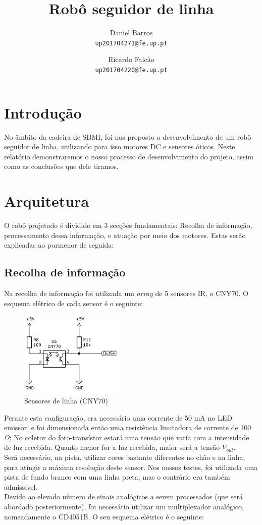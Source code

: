 \documentclass[]{report}
\title{Robô seguidor de linha}
\author{
	Daniel Barros\\
	\texttt{up201704271@fe.up.pt}
	\and
	Ricardo Falcão\\
	\texttt{up201704220@fe.up.pt}
}
\begin{document}
\maketitle

\section*{Introdução}
No âmbito da cadeira de SBMI, foi nos proposto o desenvolvimento de um robô seguidor de linha, utilizando para isso motores DC e sensores óticos. Neste relatório demonstraremos o nosso processo de desenvolvimento do projeto, assim como as conclusões que dele tiramos.

\section*{Arquitetura}
O robô projetado é dividido em 3 secções fundamentais: Recolha de informação, processamento dessa informação, e atuação por meio dos motores. Estas serão explicadas ao pormenor de seguida:

\subsection*{Recolha de informação}
Na recolha de informação foi utilizada um \textit{array} de 5 sensores IR, o CNY70. O esquema elétrico de cada sensor é o seguinte:

\begin{figure}[!htb]
	\centering
	\includegraphics[width=5cm]{imagens/sensor}
	\caption{Sensores de linha (CNY70)}
\end{figure}

Perante esta configuração, era necessário uma corrente de 50 mA no LED emissor, e foi dimensionada então uma resistência limitadora de corrente de 100 $\Omega$; No coletor do foto-transístor estará uma tensão que varía com a intensidade de luz recebida. Quanto menor for a luz recebida, maior será a tensão $V_{out}$. \\
Será necessário, na pista, utilizar cores bastante diferentes no chão e na linha, para atingir a máxima resolução deste sensor. Nos nossos testes, foi utilizada uma pista de fundo branco com uma linha preta, mas o contrário era também admissível. \\
Devido ao elevado número de sinais analógicos a serem processados (que será abordado posteriormente), foi necessário utilizar um multiplexador analógico, nomeadamente o CD4051B. O seu esquema elétrico é o seguinte:
\end{document}
